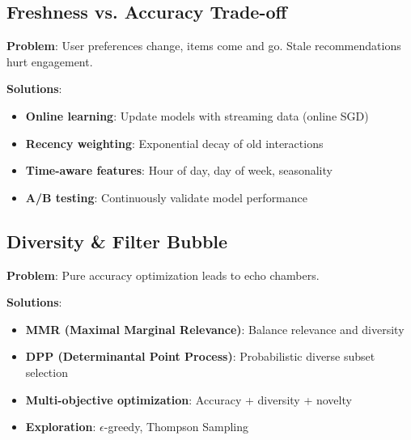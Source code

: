 \documentclass[10pt]{article}
\begin{document}
\subsection{Freshness vs. Accuracy Trade-off}

\textbf{Problem}: User preferences change, items come and go. Stale recommendations hurt engagement.

\textbf{Solutions}:
\begin{itemize}[leftmargin=*]
    \item \textbf{Online learning}: Update models with streaming data (online SGD)
    \item \textbf{Recency weighting}: Exponential decay of old interactions
    \item \textbf{Time-aware features}: Hour of day, day of week, seasonality
    \item \textbf{A/B testing}: Continuously validate model performance
\end{itemize}

\subsection{Diversity \& Filter Bubble}

\textbf{Problem}: Pure accuracy optimization leads to echo chambers.

\textbf{Solutions}:
\begin{itemize}[leftmargin=*]
    \item \textbf{MMR (Maximal Marginal Relevance)}: Balance relevance and diversity
    \item \textbf{DPP (Determinantal Point Process)}: Probabilistic diverse subset selection
    \item \textbf{Multi-objective optimization}: Accuracy + diversity + novelty
    \item \textbf{Exploration}: $\epsilon$-greedy, Thompson Sampling
\end{itemize}
\end{document}
